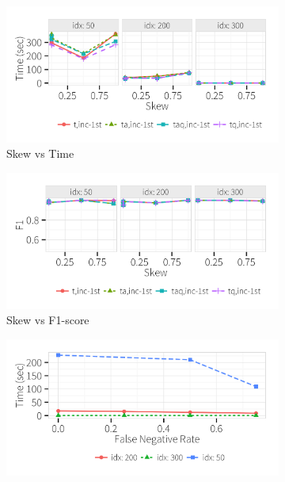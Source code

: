   \begin{figure}[h]
    \vspace*{-.1in}
    \centering
    \begin{subfigure}[t]{.23\textwidth}
    \includegraphics[width = \columnwidth]{figures/skew_time}
    \caption{Skew vs Time}
    \label{f:skew_time} 
    \end{subfigure}
    \begin{subfigure}[t]{.23\textwidth}
    \includegraphics[width = \columnwidth]{figures/skew_acc}
    \caption{Skew vs F1-score}
    \label{f:skew_acc} 
    \end{subfigure}
    \begin{subfigure}[t]{.23\textwidth}
    \includegraphics[width = .9\columnwidth]{figures/noise_fn_time}

\end{subfigure}
\end{figure}
